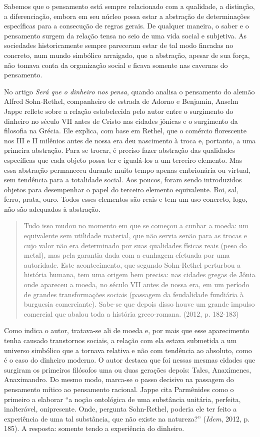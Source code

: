 Sabemos que o pensamento está sempre relacionado com a qualidade, a
distinção, a diferenciação, embora em seu núcleo possa estar a abstração
de determinações específicas para a consecução de regras gerais. De
qualquer maneira, o saber e o pensamento surgem da relação tensa no seio
de uma vida social e subjetiva. As sociedades historicamente sempre
pareceram estar de tal modo fincadas no concreto, num mundo simbólico
arraigado, que a abstração, apesar de sua força, não tomava conta da
organização social e ficava somente nas cavernas do pensamento.

No artigo \emph{Será que o dinheiro nos pensa}, quando analisa o
pensamento do alemão Alfred Sohn-Rethel, companheiro de estrada de
Adorno e Benjamin, Anselm Jappe reflete sobre a relação estabelecida
pelo autor entre o surgimento do dinheiro no século VII antes de Cristo
nas cidades jônicas e o surgimento da filosofia na Grécia. Ele explica,
com base em Rethel, que o comércio florescente nos III e II milênios
antes de nossa era deu nascimento à troca e, portanto, a uma primeira
abstração. Para se trocar, é preciso fazer abstração das qualidades
específicas que cada objeto possa ter e igualá-los a um terceiro
elemento. Mas essa abstração permaneceu durante muito tempo apenas
embrionária ou virtual, sem tendência para a totalidade social. Aos
poucos, foram sendo introduzidos objetos para desempenhar o papel do
terceiro elemento equivalente. Boi, sal, ferro, prata, ouro. Todos esses
elementos são reais e tem um uso concreto, logo, não são adequados à
abstração.

\begin{quote}
Tudo isso mudou no momento em que se começou a cunhar a moeda: um
equivalente sem utilidade material, que não servia senão para as trocas
e cujo valor não era determinado por suas qualidades físicas reais (peso
do metal), mas pela garantia dada com a cunhagem efetuada por uma
autoridade. Este acontecimento, que segundo Sohn-Rethel perturbou a
história humana, tem uma origem bem precisa: nas cidades gregas de Jônia
onde apareceu a moeda, no século VII antes de nossa era, em um período
de grandes transformações sociais (passagem da feudalidade fundiária à
burguesia comerciante). Sabe-se que depois disso houve um grande impulso
comercial que abalou toda a história greco-romana. (2012, p. 182-183)
\end{quote}

Como indica o autor, tratava-se ali de moeda e, por mais que esse
aparecimento tenha causado transtornos sociais, a relação com ela estava
submetida a um universo simbólico que a tornava relativa e não com
tendência ao absoluto, como é o caso do dinheiro moderno. O autor
destaca que foi nessas mesmas cidades que surgiram os primeiros
filósofos uma ou duas gerações depois: Tales, Anaxímenes, Anaximandro.
Do mesmo modo, marca-se o passo decisivo na passagem do pensamento
mítico ao pensamento racional. Jappe cita Parmênides como o primeiro a
elaborar ``a noção ontológica de uma substância unitária, perfeita,
inalterável, onipresente. Onde, pergunta Sohn-Rethel, poderia ele ter
feito a experiência de uma tal substância, que não existe na natureza?''
(\emph{Idem}, 2012, p. 185). A resposta: somente tendo a experiência do
dinheiro.

